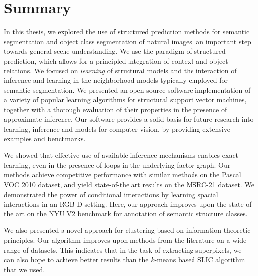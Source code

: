 \documentclass[12pt,toc=bibnumbered, a4paper,twoside,DIV=11,BCOR=.5cm]{scrbook}
\begin{document}
\section{Summary}
In this thesis, we explored the use of structured prediction methods for semantic
segmentation and object class segmentation of natural images, an important
step towards general scene understanding.
We use the paradigm of structured prediction, which allows for a principled
integration of context and object relations.
We focused on \emph{learning} of structural models and the interaction of
inference and learning in the neighborhood models typically employed for
semantic segmentation.
We presented an open source software implementation of a variety of
popular learning algorithms for structural support vector machines, together
with a thorough evaluation of their properties in the presence of approximate
inference. Our software provides a solid basis for future research into learning,
inference and models for computer vision, by providing extensive examples and
benchmarks.

We showed that effective use of available inference mechanisms enables
exact learning, even in the presence of loops in the underlying
factor graph. Our methods achieve competitive performance with similar
 methods on the Pascal VOC 2010 dataset, and yield state-of-the art
 results on the MSRC-21 dataset.
We demonstrated the power of conditional interactions by learning spacial
interactions in an RGB-D setting. Here, our approach improves upon the state-of-the
art on the NYU V2 benchmark for annotation of semantic structure classes.

We also presented a novel approach for clustering based on information theoretic
principles. Our algorithm improves upon methods from the literature on a wide
range of datasets. This indicates that in the task of extracting
superpixels, we can also hope to achieve better results than the $k$-means based
SLIC algorithm that we used.
\end{document}
